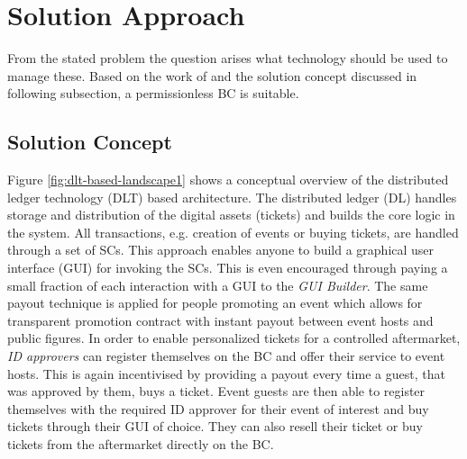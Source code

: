 \section{Solution Approach}


From the stated problem the question arises what technology should be used to manage these. Based on the work of \citet{wust2018you} and the solution concept discussed in following subsection, a permissionless BC is suitable.

\subsection{Solution Concept}\label{chapter:introduction:concept}
Figure \ref{fig:dlt-based-landscape1} shows a conceptual overview of the distributed ledger technology (DLT) based architecture. The distributed ledger (DL) handles storage and distribution of the digital assets (tickets) and builds the core logic in the system. All transactions, e.g. creation of events or buying tickets, are handled through a set of SCs. This approach enables anyone to build a graphical user interface (GUI) for invoking the SCs. This is even encouraged through paying a small fraction of each interaction with a GUI to the \textit{GUI Builder}. The same payout technique is applied for people promoting an event which allows for transparent promotion contract with instant payout between event hosts and public figures. In order to enable personalized tickets for a controlled aftermarket, \textit{ID approvers} can register themselves on the BC and offer their service to event hosts. This is again incentivised by providing a payout every time a guest, that was approved by them, buys a ticket. Event guests are then able to register themselves with the required ID approver for their event of interest and buy tickets through their GUI of choice. They can also resell their ticket or buy tickets from the aftermarket directly on the BC.
